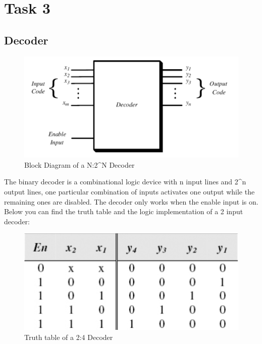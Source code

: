 



\section*{Task 3}

\subsection*{Decoder}

\begin{figure}[H]
  \begin{centering}
  \includegraphics[scale=1]{decoder.png}
  \par\end{centering}
  \caption{Block Diagram of a N:2^{N} Decoder}
\end{figure}


The binary decoder is a combinational logic device with n input lines and 2^{n} output lines, one particular combination of inputs activates one output while the remaining ones are disabled. The decoder only works when the enable input is on. Below you can find the truth table and the logic implementation of a 2 input decoder:

\begin{figure}[H]
  \begin{centering}
  \includegraphics[scale=1]{decodertable.png}
  \par\end{centering}
  \caption{Truth table of a 2:4 Decoder}
\end{figure}


